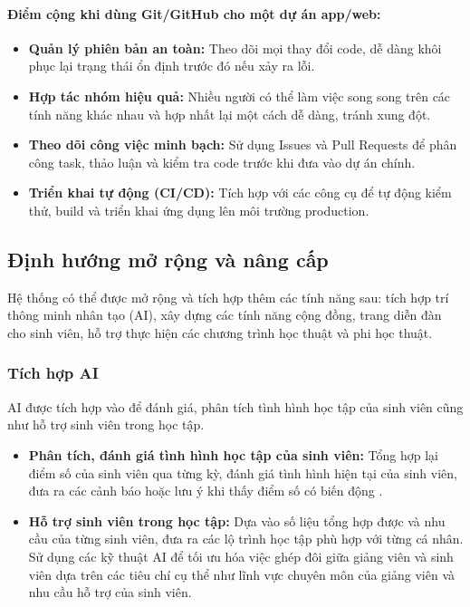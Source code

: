 \documentclass[a4paper, 15pt]{article}
\begin{document}
\paragraph{Điểm cộng khi dùng Git/GitHub cho một dự án app/web:}
\begin{itemize}
    \item \textbf{Quản lý phiên bản an toàn:}  
    Theo dõi mọi thay đổi code, dễ dàng khôi phục lại trạng thái ổn định trước đó nếu xảy ra lỗi.

    \item \textbf{Hợp tác nhóm hiệu quả:}  
    Nhiều người có thể làm việc song song trên các tính năng khác nhau và hợp nhất lại một cách dễ dàng, tránh xung đột.

    \item \textbf{Theo dõi công việc minh bạch:}  
    Sử dụng Issues và Pull Requests để phân công task, thảo luận và kiểm tra code trước khi đưa vào dự án chính.

    \item \textbf{Triển khai tự động (CI/CD):}  
    Tích hợp với các công cụ để tự động kiểm thử, build và triển khai ứng dụng lên môi trường production.
\end{itemize}

\subsection{Định hướng mở rộng và nâng cấp} 
Hệ thống có thể được mở rộng và tích hợp thêm các tính năng sau: tích hợp trí thông minh nhân tạo (AI), xây dựng các tính năng cộng đồng, trang diễn đàn cho sinh viên, hỗ trợ thực hiện các chương trình học thuật và phi học thuật.

\subsubsection{Tích hợp AI}
AI được tích hợp vào để đánh giá, phân tích tình hình học tập của sinh viên cũng như hỗ trợ sinh viên trong học tập.
\begin{itemize}
    \item \textbf{Phân tích, đánh giá tình hình học tập của sinh viên:}
    Tổng hợp lại điểm số của sinh viên qua từng kỳ, đánh giá tình hình hiện tại của sinh viên, đưa ra các cảnh báo hoặc lưu ý khi thấy điểm số có biến động .
    
    \item  \textbf{Hỗ trợ sinh viên trong học tập:}
    Dựa vào số liệu tổng hợp được và nhu cầu của từng sinh viên, đưa ra các lộ trình học tập phù hợp với từng cá nhân. Sử dụng các kỹ thuật AI để tối ưu hóa việc ghép đôi giữa giảng viên và sinh viên dựa trên các tiêu chí cụ thể như lĩnh vực chuyên môn của giảng viên và nhu cầu hỗ trợ của sinh viên.
\end{itemize}
\end{document}

